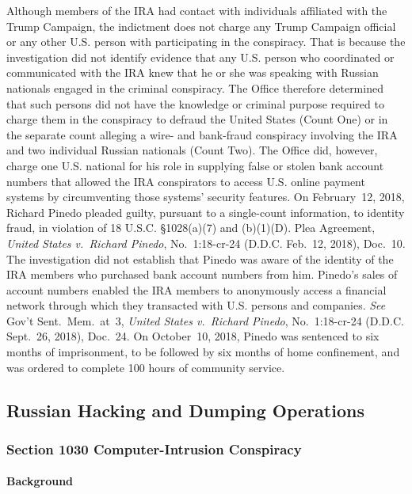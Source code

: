Although members of the IRA had contact with individuals affiliated with the Trump Campaign, the indictment does not charge any Trump Campaign official or any other U.S. person with participating in the conspiracy.
That is because the investigation did not identify evidence that any U.S. person who coordinated or communicated with the IRA knew that he or she was speaking with Russian nationals engaged in the criminal conspiracy.
The Office therefore determined that such persons did not have the knowledge or criminal purpose required to charge them in the conspiracy to defraud the United States (Count One) or in the separate count alleging a wire- and bank-fraud conspiracy involving the IRA and two individual Russian nationals (Count Two).
The Office did, however, charge one U.S. national for his role in supplying false or stolen bank account numbers that allowed the IRA conspirators to access U.S. online payment systems by circumventing those systems' security features.
On February~12, 2018, Richard Pinedo pleaded guilty, pursuant to a single-count information, to identity fraud, in violation of 18 U.S.C. \S 1028(a)(7) and (b)(1)(D).
Plea Agreement, \textit{United States v.\ Richard Pinedo}, No.~1:18-cr-24 (D.D.C. Feb.~12, 2018), Doc.~10.
The investigation did not establish that Pinedo was aware of the identity of the IRA members who purchased bank account numbers from him.
Pinedo's sales of account numbers enabled the IRA members to anonymously access a financial network through which they transacted with U.S. persons and companies.
\textit{See} Gov't Sent.~Mem.~at~3, \textit{United States v.\ Richard Pinedo}, No.~1:18-cr-24 (D.D.C. Sept.~26, 2018), Doc.~24.
On October~10, 2018, Pinedo was sentenced to six months of imprisonment, to be followed by six months of home confinement, and was ordered to complete 100 hours of community service.

\subsection{Russian Hacking and Dumping Operations}

\subsubsection{Section 1030 Computer-Intrusion Conspiracy}

\paragraph{Background}

